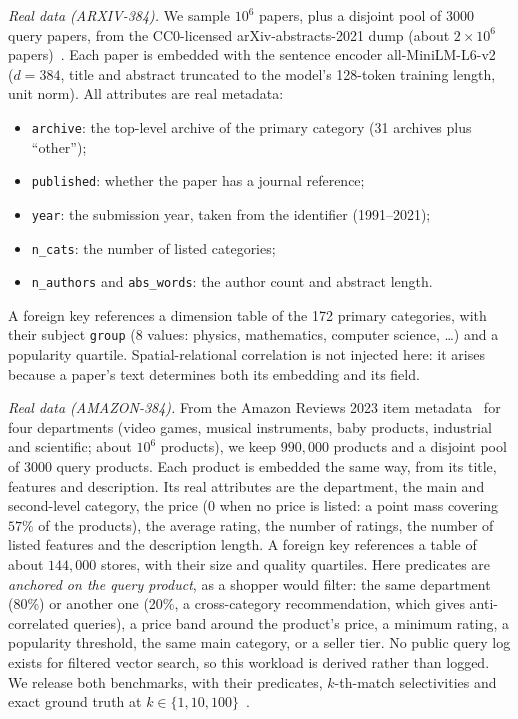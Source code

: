 \documentclass[sigconf,nonacm]{acmart}
\begin{document}
\emph{Real data (ARXIV-384).} We sample $10^6$ papers, plus a disjoint pool of $3000$ query papers, from the CC0-licensed arXiv-abstracts-2021 dump (about $2\times10^6$ papers)~\cite{arxivdump}. Each paper is embedded with the sentence encoder all-MiniLM-L6-v2~\cite{reimers2019sbert} ($d=384$, title and abstract truncated to the model's 128-token training length, unit norm). All attributes are real metadata:
\begin{itemize}
    \item \texttt{archive}: the top-level archive of the primary category (31 archives plus ``other'');
    \item \texttt{published}: whether the paper has a journal reference;
    \item \texttt{year}: the submission year, taken from the identifier (1991--2021);
    \item \texttt{n\_cats}: the number of listed categories;
    \item \texttt{n\_authors} and \texttt{abs\_words}: the author count and abstract length.
\end{itemize}
A foreign key references a dimension table of the 172 primary categories, with their subject \texttt{group} (8 values: physics, mathematics, computer science, \ldots) and a popularity quartile. Spatial-relational correlation is not injected here: it arises because a paper's text determines both its embedding and its field.

\emph{Real data (AMAZON-384).} From the Amazon Reviews 2023 item metadata~\cite{hou2024amazon} for four departments (video games, musical instruments, baby products, industrial and scientific; about $10^6$ products), we keep $990{,}000$ products and a disjoint pool of $3000$ query products. Each product is embedded the same way, from its title, features and description. Its real attributes are the department, the main and second-level category, the price (0 when no price is listed: a point mass covering $57\%$ of the products), the average rating, the number of ratings, the number of listed features and the description length. A foreign key references a table of about $144{,}000$ stores, with their size and quality quartiles. Here predicates are \emph{anchored on the query product}, as a shopper would filter: the same department (80\%) or another one (20\%, a cross-category recommendation, which gives anti-correlated queries), a price band around the product's price, a minimum rating, a popularity threshold, the same main category, or a seller tier. No public query log exists for filtered vector search, so this workload is derived rather than logged. We release both benchmarks, with their predicates, $k$-th-match selectivities and exact ground truth at $k\in\{1,10,100\}$~\cite{hvobench}.
\end{document}
